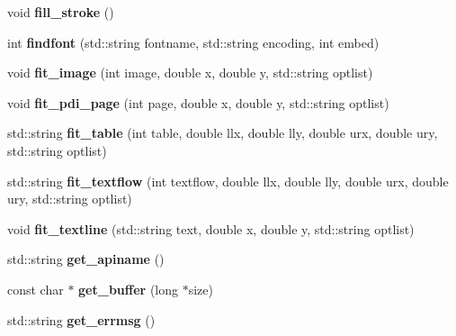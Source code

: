 \begin{DoxyCompactItemize}
\item 
\hypertarget{classPDFlib_af075d64fe8d704204883c548b7d48460}{void {\bfseries fill\-\_\-stroke} ()}\label{classPDFlib_af075d64fe8d704204883c548b7d48460}

\item 
\hypertarget{classPDFlib_a07e3c184619af04184b342136c97b30a}{int {\bfseries findfont} (std\-::string fontname, std\-::string encoding, int embed)}\label{classPDFlib_a07e3c184619af04184b342136c97b30a}

\item 
\hypertarget{classPDFlib_ae190bced58224501fce22ab778e7855b}{void {\bfseries fit\-\_\-image} (int image, double x, double y, std\-::string optlist)}\label{classPDFlib_ae190bced58224501fce22ab778e7855b}

\item 
\hypertarget{classPDFlib_aec960d2bb746ba340bcb0e275393aea4}{void {\bfseries fit\-\_\-pdi\-\_\-page} (int page, double x, double y, std\-::string optlist)}\label{classPDFlib_aec960d2bb746ba340bcb0e275393aea4}

\item 
\hypertarget{classPDFlib_a78221047371a56fe1680715e8f3ceceb}{std\-::string {\bfseries fit\-\_\-table} (int table, double llx, double lly, double urx, double ury, std\-::string optlist)}\label{classPDFlib_a78221047371a56fe1680715e8f3ceceb}

\item 
\hypertarget{classPDFlib_ae0b36af24521c5e8e87998ea3eb31f40}{std\-::string {\bfseries fit\-\_\-textflow} (int textflow, double llx, double lly, double urx, double ury, std\-::string optlist)}\label{classPDFlib_ae0b36af24521c5e8e87998ea3eb31f40}

\item 
\hypertarget{classPDFlib_ad451733ee7844848d649a1e1a551623c}{void {\bfseries fit\-\_\-textline} (std\-::string text, double x, double y, std\-::string optlist)}\label{classPDFlib_ad451733ee7844848d649a1e1a551623c}

\item 
\hypertarget{classPDFlib_a84199831e344c9705e47ea184e92a650}{std\-::string {\bfseries get\-\_\-apiname} ()}\label{classPDFlib_a84199831e344c9705e47ea184e92a650}

\item 
\hypertarget{classPDFlib_a29b236d867ff4067adf448ce031283eb}{const char $\ast$ {\bfseries get\-\_\-buffer} (long $\ast$size)}\label{classPDFlib_a29b236d867ff4067adf448ce031283eb}

\item 
\hypertarget{classPDFlib_aa36d3f54ab4dffc2efaad369bb9257f8}{std\-::string {\bfseries get\-\_\-errmsg} ()}\label{classPDFlib_aa36d3f54ab4dffc2efaad369bb9257f8}


\end{DoxyCompactItemize}
